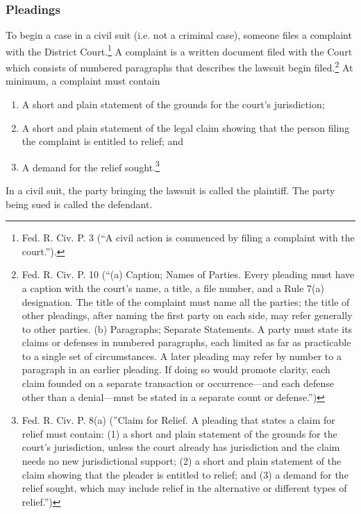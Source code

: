 \subsubsection{Pleadings}
To begin a case in a civil suit  (i.e. not a criminal case), someone files a complaint with the District Court.\footnote{Fed. R. Civ. P. 3 (``A civil action is commenced by filing a complaint with the court.'').}  A complaint is a written document filed with the Court which consists of numbered paragraphs that describes the lawsuit begin filed.\footnote{Fed. R. Civ. P. 10 (``(a) Caption; Names of Parties. Every pleading must have a caption with the court's name, a title, a file number, and a Rule 7(a) designation. The title of the complaint must name all the parties; the title of other pleadings, after naming the first party on each side, may refer generally to other parties.  (b) Paragraphs; Separate Statements. A party must state its claims or defenses in numbered paragraphs, each limited as far as practicable to a single set of circumstances. A later pleading may refer by number to a paragraph in an earlier pleading. If doing so would promote clarity, each claim founded on a separate transaction or occurrence—and each defense other than a denial—must be stated in a separate count or defense.'')}  At minimum, a complaint must contain
\begin{enumerate}
\item A short and plain statement of the grounds for the court's jurisdiction;
\item A short and plain statement of the legal claim showing that the person filing the complaint is entitled to relief; and 
\item A demand for the relief sought.\footnote{Fed. R. Civ. P. 8(a) (''Claim for Relief. A pleading that states a claim for relief must contain: (1) a short and plain statement of the grounds for the court's jurisdiction, unless the court already has jurisdiction and the claim needs no new jurisdictional support; (2) a short and plain statement of the claim showing that the pleader is entitled to relief; and (3) a demand for the relief sought, which may include relief in the alternative or different types of relief.'')}
\end{enumerate}

In a civil suit, the party bringing the lawsuit is called the plaintiff.  The party being sued is called the defendant.


